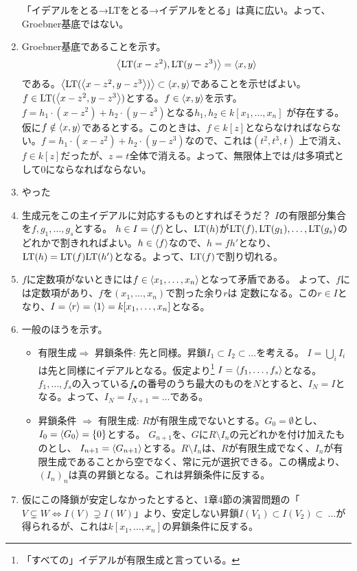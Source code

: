 \documentclass[9pt]{ltjsarticle}
\begin{document}
\begin{enumerate}[label=(問題\arabic*)]
「イデアルをとる→LTをとる→イデアルをとる」は真に広い。よって、Groebner基底ではない。
\item Groebner基底であることを示す。
\begin{align}
  \left\langle {\rm LT}(x-z^2),{\rm LT}(y-z^3) \right\rangle = \left\langle x,y \right\rangle
\end{align}
である。$\left\langle {\rm LT}(\left\langle x-z^2,y-z^3 \right\rangle) \right\rangle\subset \left\langle x,y \right\rangle$であることを示せばよい。
$f\in {\rm LT}(\left\langle x-z^2,y-z^3 \right\rangle)$とする。$f\in \left\langle x,y \right\rangle$を示す。
$f=h_1\cdot (x-z^2) + h_2 \cdot (y-z^3)$となる$h_1,h_2 \in k[x_1,\dots,x_n]$
が存在する。
仮に$f\notin \left\langle x,y \right\rangle$であるとする。このときは、$f\in k[z]$とならなければならない。$f=h_1\cdot(x-z^2) + h_2\cdot (y-z^3)$なので、これは$(t^2,t^3,t)$
上で消え、$f\in k[z]$だったが、$z=t$全体で消える。よって、無限体上では$f$は多項式として0にならなればならない。
\item やった
\item 生成元をこの主イデアルに対応するものとすればそうだ？
$I$の有限部分集合を$f,g_1,\dots,g_s$とする。
$h\in I = \left\langle f \right\rangle$とし、${\rm LT}(h)$が${\rm LT}(f),{\rm LT}(g_1),\dots,{\rm LT}(g_s)$のどれかで割きれればよい。$h \in \left\langle f \right\rangle$なので、$h = f h'$となり、${\rm LT}(h) = {\rm LT}(f){\rm LT}(h')$となる。よって、${\rm LT}(f)$で割り切れる。
\item $f$に定数項がないときには$f\in \left\langle x_1,\dots,x_n \right\rangle$となって矛盾である。
よって、$f$には定数項があり、$f$を$(x_1,\dots,x_n)$で割った余り$r$は
定数になる。この$r \in I$となり、$I = \left\langle r \right\rangle = \left\langle 1 \right\rangle = k[x_1,\dots,x_n]$となる。
\item 一般のほうを示す。
\begin{itemize}
  \item 有限生成$\Rightarrow$ 昇鎖条件:
  先と同様。昇鎖$I_1 \subset I_2 \subset \dots$を考える。
  $I=\bigcup_{i} I_i$は先と同様にイデアルとなる。仮定より\footnote{「すべての」イデアルが有限生成と言っている。}
  $I=\left\langle f_1,\dots,f_s \right\rangle$となる。$f_1,\dots,f_s$の入っている$f_\bullet$の番号のうち最大のものを$N$とすると、$I_N = I$となる。よって、$I_{N} = I_{N+1}=\dots$である。
  \item 昇鎖条件 $\Rightarrow$ 有限生成:
  $R$が有限生成でないとする。$G_0 = \emptyset$とし、$I_0 = \left\langle G_0 \right\rangle = \{0\}$とする。
  $G_{n+1}$を、$G$に$R\setminus I_n$の元どれかを付け加えたものとし、
  $I_{n+1} = \left\langle G_{n+1} \right\rangle$とする。$R\setminus I_n$は、$R$が有限生成でなく、$I_n$が有限生成であることから空でなく、常に元が選択できる。この構成より、$(I_n)_n$は真の昇鎖となる。これは昇鎖条件に反する。
\end{itemize}
\item 仮にこの降鎖が安定しなかったとすると、1章4節の演習問題の「$V \subsetneq W \iff I(V) \supsetneq I(W)$」より、安定しない昇鎖$I(V_1) \subset I(V_2) \subset\ \dots$が得られるが、これは$k[x_1,\dots,x_n]$の昇鎖条件に反する。

\end{enumerate}
\end{document}
